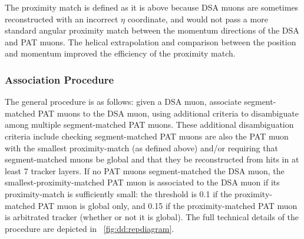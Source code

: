 The proximity match is defined as it is above because DSA muons are sometimes reconstructed with an incorrect $\eta$ coordinate, and would not pass a more standard angular proximity match between the momentum directions of the DSA and PAT muons.
The helical extrapolation and comparison between the position and momentum improved the efficiency of the proximity match.

\subsubsection{\DSAToPAT Association Procedure}
The general procedure is as follows: given a DSA muon, associate segment-matched PAT muons to the DSA muon, using additional criteria to disambiguate among multiple segment-matched PAT muons.
These additional disambiguation criteria include checking segment-matched PAT muons are also the PAT muon with the smallest proximity-match \deltaR (as defined above) and/or requiring that segment-matched muons be global and that they be reconstructed from hits in at least 7 tracker layers.
If no PAT muons segment-matched the DSA muon, the smallest-\deltaR proximity-matched PAT muon is associated to the DSA muon if its proximity-match \deltaR is sufficiently small: the threshold is 0.1 if the proximity-matched PAT muon is global only, and 0.15 if the proximity-matched PAT muon is arbitrated tracker (whether or not it is global).
The full technical details of the procedure are depicted in \Fig~\ref{fig:dd:repdiagram}.

